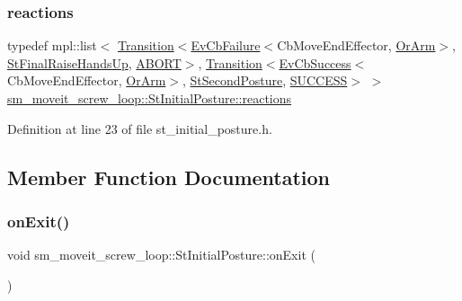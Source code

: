 \subsubsection{\texorpdfstring{reactions}{reactions}}
{\footnotesize\ttfamily typedef mpl\+::list$<$ \hyperlink{classsmacc_1_1Transition}{Transition}$<$\hyperlink{structsmacc_1_1EvCbFailure}{Ev\+Cb\+Failure}$<$Cb\+Move\+End\+Effector, \hyperlink{classsm__moveit__screw__loop_1_1OrArm}{Or\+Arm}$>$, \hyperlink{structsm__moveit__screw__loop_1_1StFinalRaiseHandsUp}{St\+Final\+Raise\+Hands\+Up}, \hyperlink{structsmacc_1_1default__transition__tags_1_1ABORT}{A\+B\+O\+RT}$>$, \hyperlink{classsmacc_1_1Transition}{Transition}$<$\hyperlink{structsmacc_1_1EvCbSuccess}{Ev\+Cb\+Success}$<$Cb\+Move\+End\+Effector, \hyperlink{classsm__moveit__screw__loop_1_1OrArm}{Or\+Arm}$>$, \hyperlink{structsm__moveit__screw__loop_1_1StSecondPosture}{St\+Second\+Posture}, \hyperlink{structsmacc_1_1default__transition__tags_1_1SUCCESS}{S\+U\+C\+C\+E\+SS}$>$ $>$ \hyperlink{structsm__moveit__screw__loop_1_1StInitialPosture_a2544cded038cf7664377952d4b408d0d}{sm\+\_\+moveit\+\_\+screw\+\_\+loop\+::\+St\+Initial\+Posture\+::reactions}}



Definition at line 23 of file st\+\_\+initial\+\_\+posture.\+h.



\subsection{Member Function Documentation}
\mbox{\label{structsm__moveit__screw__loop_1_1StInitialPosture_a92bbc7e9ee3f54209212ce62b95ee557}} 
\subsubsection{\texorpdfstring{on\+Exit()}{onExit()}}
{\footnotesize\ttfamily void sm\+\_\+moveit\+\_\+screw\+\_\+loop\+::\+St\+Initial\+Posture\+::on\+Exit (\begin{DoxyParamCaption}{ }\end{DoxyParamCaption})\hspace{0.3cm}{\ttfamily [inline]}}



